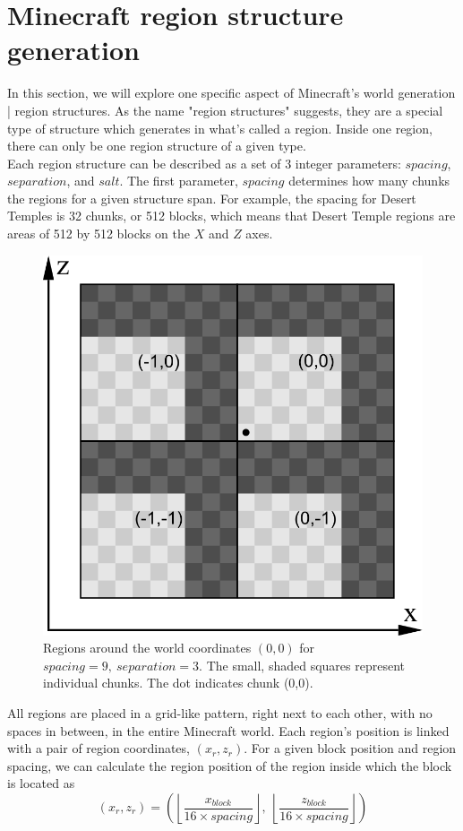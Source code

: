 \documentclass{article}
\begin{document}
\section{Minecraft region structure generation}\label{appendix.regionstructures}

In this section, we will explore one specific aspect of Minecraft's world generation | region structures.
As the name "region structures" suggests, they are a special type of structure which generates in what's called a region. Inside one region, there can only be one region structure of a given type.\\
Each region structure can be described as a set of 3 integer parameters: $spacing$, $separation$, and $salt$. The first parameter, $spacing$ determines how many chunks the regions for a given structure span. For example, the spacing for Desert Temples is 32 chunks, or 512 blocks, which means that Desert Temple regions are areas of 512 by 512 blocks on the $X$ and $Z$ axes. \\

\begin{figure}[htbp]
    \centering
    \includegraphics[width=0.5\linewidth]{regions.png}
    \caption{Regions around the world coordinates $(0,0)$ for $spacing = 9, \ separation = 3$. The small, shaded squares represent individual chunks. The dot indicates chunk (0,0).}
    \label{fig:regions}
\end{figure}

All regions are placed in a grid-like pattern, right next to each other, with no spaces in between, in the entire Minecraft world. Each region's position is linked with a pair of region coordinates, $(x_r, z_r)$. For a given block position and region spacing, we can calculate the region position of the region inside which the block is located as
\begin{equation}
    (x_r, z_r) = \left( \left\lfloor \frac{x_{block}}{16 \times spacing} \right\rfloor,\ \left\lfloor \frac{z_{block}}{16 \times spacing} \right\rfloor \right)
\end{equation}
\end{document}
